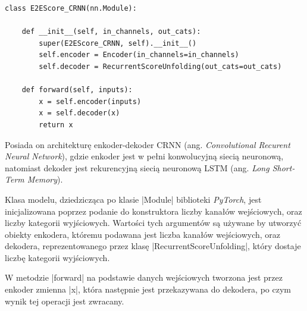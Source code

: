 \begin{lstlisting}[caption={\pyth|E2EScore_CRNN| - klasa modelu głębokiego uczenia do rozpoznawania zapisu nutowego}, label={E2E-CRNN}]
class E2EScore_CRNN(nn.Module):

	def __init__(self, in_channels, out_cats):
		super(E2EScore_CRNN, self).__init__()
		self.encoder = Encoder(in_channels=in_channels)		
		self.decoder = RecurrentScoreUnfolding(out_cats=out_cats)
	
	def forward(self, inputs):
		x = self.encoder(inputs)
		x = self.decoder(x)
		return x
\end{lstlisting}

Posiada on architekturę enkoder-dekoder CRNN (ang. \textit{Convolutional Recurent Neural Network}), gdzie enkoder jest w pełni konwolucyjną siecią neuronową, natomiast dekoder jest rekurencyjną siecią neuronową LSTM (ang. \textit{Long Short-Term Memory}).

Klasa modelu, dziedzicząca po klasie \pyth|Module| biblioteki \textit{PyTorch}, jest inicjalizowana poprzez podanie do konstruktora liczby kanałów wejściowych, oraz liczby kategorii wyjściowych. Wartości tych argumentów są używane by utworzyć obiekty enkodera, któremu podawana jest liczba kanałów wejściowych, oraz dekodera, reprezentowanego przez klasę \pyth|RecurrentScoreUnfolding|, który dostaje liczbę kategorii wyjściowych.

W metodzie \pyth|forward| na podstawie danych wejściowych tworzona jest przez enkoder zmienna \pyth|x|, która następnie jest przekazywana do dekodera, po czym wynik tej operacji jest zwracany.



